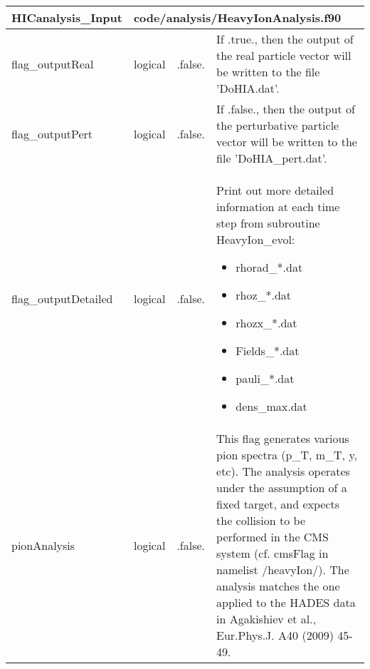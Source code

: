 \documentclass{article}
\begin{document}

\begin{longtable}{llll}
\toprule
\textbf{\large{HICanalysis\_Input}} & \multicolumn{3}{l}{\footnotesize{code/analysis/HeavyIonAnalysis.f90}}\\*
\midrule
\endfirsthead
\midrule
\endhead
flag\_outputReal & \begin{minipage}[t]{2cm}logical\end{minipage} & \begin{minipage}[t]{2cm}.false.\end{minipage} & \begin{minipage}[t]{12cm}If .true., then the output of the real particle vector will be written to the file 'DoHIA.dat'.\end{minipage}\\*
\midrule
flag\_outputPert & \begin{minipage}[t]{2cm}logical\end{minipage} & \begin{minipage}[t]{2cm}.false.\end{minipage} & \begin{minipage}[t]{12cm}If .false., then the output of the perturbative particle vector will be written to the file 'DoHIA\_pert.dat'.\end{minipage}\\*
\midrule
flag\_outputDetailed & \begin{minipage}[t]{2cm}logical\end{minipage} & \begin{minipage}[t]{2cm}.false.\end{minipage} & \begin{minipage}[t]{12cm}Print out more detailed information at each time step from subroutine HeavyIon\_evol:\begin{itemize}\leftmargin0em\itemindent0pt\item rhorad\_*.dat\item rhoz\_*.dat\item rhozx\_*.dat\item Fields\_*.dat\item pauli\_*.dat\item dens\_max.dat\end{itemize}\end{minipage}\\*
\midrule
pionAnalysis & \begin{minipage}[t]{2cm}logical\end{minipage} & \begin{minipage}[t]{2cm}.false.\end{minipage} & \begin{minipage}[t]{12cm}This flag generates various pion spectra (p\_T, m\_T, y, etc). The analysis operates under the assumption of a fixed target, and expects the collision to be performed in the CMS system (cf. cmsFlag in namelist /heavyIon/). The analysis matches the one applied to the HADES data in Agakishiev et al., Eur.Phys.J. A40 (2009) 45-49.\end{minipage}\\*

\end{longtable}
\end{document}
